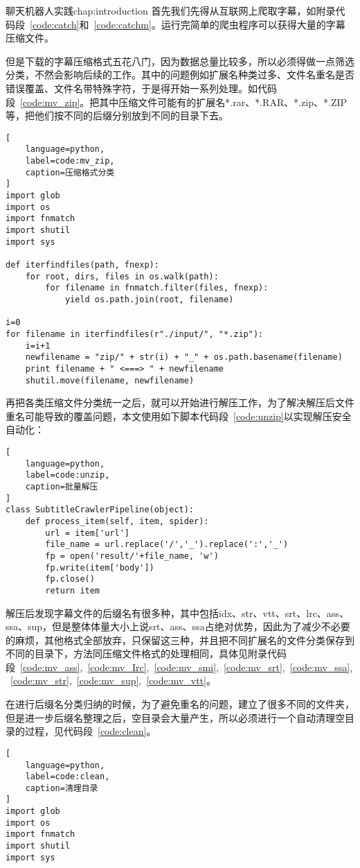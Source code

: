 \begin{cuzchapter}{聊天机器人实践}{chap:introduction}
首先我们先得从互联网上爬取字幕，如附录代码段~\ref{code:catch}和~\ref{code:catchm}。运行完简单的爬虫程序可以获得大量的字幕压缩文件。

但是下载的字幕压缩格式五花八门，因为数据总量比较多，所以必须得做一点筛选分类，不然会影响后续的工作。其中的问题例如扩展名种类过多、文件名重名是否错误覆盖、文件名带特殊字符，于是得开始一系列处理。如代码段~\ref{code:mv_zip}。把其中压缩文件可能有的扩展名*.rar、*.RAR、*.zip、*.ZIP等，把他们按不同的后缀分别放到不同的目录下去。
\begin{lstlisting}[
    language=python,
    label=code:mv_zip,
    caption=压缩格式分类
]
import glob
import os
import fnmatch
import shutil
import sys

def iterfindfiles(path, fnexp):
    for root, dirs, files in os.walk(path):
        for filename in fnmatch.filter(files, fnexp):
            yield os.path.join(root, filename)

i=0
for filename in iterfindfiles(r"./input/", "*.zip"):
    i=i+1
    newfilename = "zip/" + str(i) + "_" + os.path.basename(filename)
    print filename + " <===> " + newfilename
    shutil.move(filename, newfilename)
\end{lstlisting}

再把各类压缩文件分类统一之后，就可以开始进行解压工作，为了解决解压后文件重名可能导致的覆盖问题，本文使用如下脚本代码段~\ref{code:unzip}以实现解压安全自动化：
\begin{lstlisting}[
    language=python,
    label=code:unzip,
    caption=批量解压
]
class SubtitleCrawlerPipeline(object):
    def process_item(self, item, spider):
        url = item['url']
        file_name = url.replace('/','_').replace(':','_')
        fp = open('result/'+file_name, 'w')
        fp.write(item['body'])
        fp.close()
        return item
\end{lstlisting}

解压后发现字幕文件的后缀名有很多种，其中包括idx、str、vtt、srt、lrc、ass、ssa、sup，但是整体体量大小上说srt、ass、ssa占绝对优势，因此为了减少不必要的麻烦，其他格式全部放弃，只保留这三种，并且把不同扩展名的文件分类保存到不同的目录下，方法同压缩文件格式的处理相同，具体见附录代码段~\ref{code:mv_ass},~\ref{code:mv_Irc},~\ref{code:mv_smi},~\ref{code:mv_srt},~\ref{code:mv_ssa},~\ref{code:mv_str},~\ref{code:mv_sup},~\ref{code:mv_vtt}。

在进行后缀名分类归纳的时候，为了避免重名的问题，建立了很多不同的文件夹，但是进一步后缀名整理之后，空目录会大量产生，所以必须进行一个自动清理空目录的过程，见代码段~\ref{code:clean}。
\begin{lstlisting}[
    language=python,
    label=code:clean,
    caption=清理目录
]
import glob
import os
import fnmatch
import shutil
import sys


\end{lstlisting}
\end{cuzchapter}
